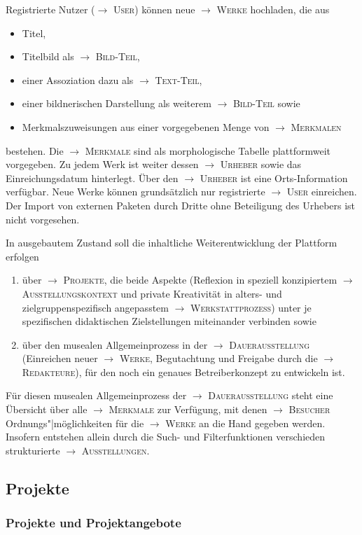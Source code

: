 \documentclass[a4paper,11pt]{article}
\newcommand{\glossar}[1]{{$\to$ \textsc{#1}}}
\begin{document}
Registrierte Nutzer (\glossar{User}) können neue \glossar{Werke} hochladen, die
aus
\begin{itemize}\itemsep0pt
\item Titel, 
\item Titelbild als \glossar{Bild-Teil},  
\item einer Assoziation dazu als \glossar{Text-Teil}, 
\item einer bildnerischen Darstellung als weiterem \glossar{Bild-Teil} sowie
\item Merkmalszuweisungen aus einer vorgegebenen Menge von \glossar{Merkmalen}
\end{itemize}
bestehen.  Die \glossar{Merkmale} sind als morphologische Tabelle
plattformweit vorgegeben.  Zu jedem Werk ist weiter dessen \glossar{Urheber}
sowie das Einreichungsdatum hinterlegt.  Über den \glossar{Urheber} ist eine
Orts-Information verfügbar. Neue Werke können grundsätzlich nur registrierte
\glossar{User} einreichen.  Der Import von externen Paketen durch Dritte ohne
Beteiligung des Urhebers ist nicht vorgesehen.

In ausgebautem Zustand soll die inhaltliche Weiterentwicklung der Plattform
erfolgen 
\begin{enumerate}
\item über \glossar{Projekte}, die beide Aspekte (Reflexion in speziell
  konzipiertem \glossar{Ausstellungskontext} und private Kreativität in
  alters- und zielgruppenspezifisch angepasstem \glossar{Werkstattprozess})
  unter je spezifischen didaktischen Zielstellungen miteinander verbinden
  sowie 
\item über den musealen Allgemeinprozess in der \glossar{Dauerausstellung}
  (Einreichen neuer \glossar{Werke}, Begutachtung und Freigabe durch die
  \glossar{Redakteure}), für den noch ein genaues Betreiberkonzept zu
  entwickeln ist.
\end{enumerate}
Für diesen musealen Allgemeinprozess der \glossar{Dauerausstellung} steht eine
Übersicht über alle \glossar{Merkmale} zur Verfügung, mit denen
\glossar{Besucher} Ordnungs"|möglichkeiten für die \glossar{Werke} an die Hand
gegeben werden. Insofern entstehen allein durch die Such- und Filterfunktionen
verschieden strukturierte \glossar{Ausstellungen}.

\subsection{Projekte}\label{grundlagen.projekte}

\subsubsection{Projekte und Projektangebote}
\end{document}
